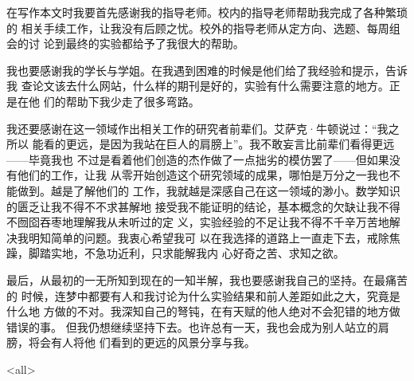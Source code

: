 \documentclass[../main]{subfiles}
\begin{document}
\mode*

\begin{acknowledgement}

  在写作本文时我要首先感谢我的指导老师。校内的指导老师帮助我完成了各种繁琐的
  相关手续工作，让我没有后顾之忧。校外的指导老师从定方向、选题、每周组会的讨
  论到最终的实验都给予了我很大的帮助。

  我也要感谢我的学长与学姐。在我遇到困难的时候是他们给了我经验和提示，告诉我
  查论文该去什么网站，什么样的期刊是好的，实验有什么需要注意的地方。正是在他
  们的帮助下我少走了很多弯路。

  我还要感谢在这一领域作出相关工作的研究者前辈们。艾萨克·牛顿说过：“我之所以
  能看的更远，是因为我站在巨人的肩膀上”。我不敢妄言比前辈们看得更远——毕竟我也
  不过是看着他们创造的杰作做了一点拙劣的模仿罢了——但如果没有他们的工作，让我
  从零开始创造这个研究领域的成果，哪怕是万分之一我也不能做到。越是了解他们的
  工作，我就越是深感自己在这一领域的渺小。数学知识的匮乏让我不得不不求甚解地
  接受我不能证明的结论，基本概念的欠缺让我不得不囫囵吞枣地理解我从未听过的定
  义，实验经验的不足让我不得不千辛万苦地解决我明知简单的问题。我衷心希望我可
  以在我选择的道路上一直走下去，戒除焦躁，脚踏实地，不急功近利，只求能解我内
  心好奇之苦、求知之欲。

  最后，从最初的一无所知到现在的一知半解，我也要感谢我自己的坚持。在最痛苦的
  时候，连梦中都要有人和我讨论为什么实验结果和前人差距如此之大，究竟是什么地
  方做的不对。我深知自己的弩钝，在有天赋的他人绝对不会犯错的地方做错误的事。
  但我仍想继续坚持下去。也许总有一天，我也会成为别人站立的肩膀，将会有人将他
  们看到的更远的风景分享与我。
\end{acknowledgement}

\mode<all>
\end{document}

